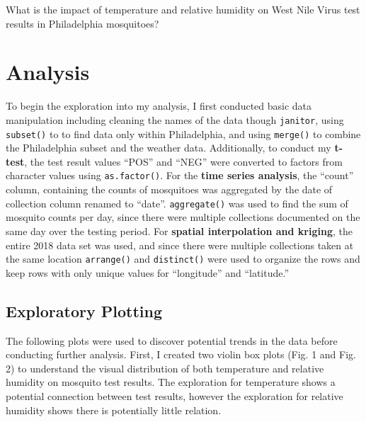 \documentclass[
  letterpaper,
  DIV=11,
  numbers=noendperiod]{scrartcl}
\begin{document}
What is the impact of temperature and relative humidity on West Nile
Virus test results in Philadelphia mosquitoes?

\hypertarget{analysis}{%
\section{Analysis}\label{analysis}}

To begin the exploration into my analysis, I first conducted basic data
manipulation including cleaning the names of the data though
\texttt{janitor}, using \texttt{subset()} to to find data only within
Philadelphia, and using \texttt{merge()} to combine the Philadelphia
subset and the weather data. Additionally, to conduct my
\textbf{t-test}, the test result values ``POS'' and ``NEG'' were
converted to factors from character values using \texttt{as.factor()}.
For the \textbf{time series analysis}, the ``count'' column, containing
the counts of mosquitoes was aggregated by the date of collection column
renamed to ``date''. \texttt{aggregate()} was used to find the sum of
mosquito counts per day, since there were multiple collections
documented on the same day over the testing period. For \textbf{spatial
interpolation and kriging}, the entire 2018 data set was used, and since
there were multiple collections taken at the same location
\texttt{arrange()} and \texttt{distinct()} were used to organize the
rows and keep rows with only unique values for ``longitude'' and
``latitude.''

\hypertarget{exploratory-plotting}{%
\subsection{Exploratory Plotting}\label{exploratory-plotting}}

The following plots were used to discover potential trends in the data
before conducting further analysis. First, I created two violin box
plots (Fig. 1 and Fig. 2) to understand the visual distribution of both
temperature and relative humidity on mosquito test results. The
exploration for temperature shows a potential connection between test
results, however the exploration for relative humidity shows there is
potentially little relation.
\end{document}
